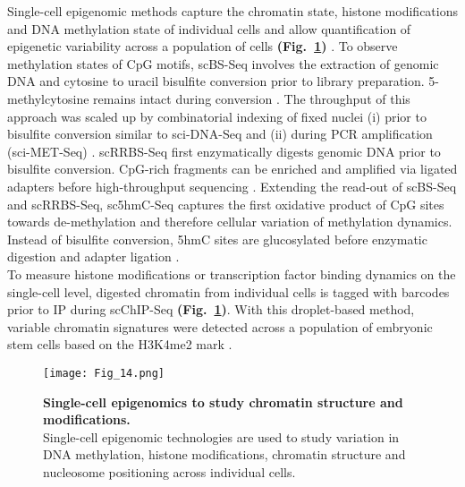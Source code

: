 Single-cell epigenomic methods capture the chromatin state, histone modifications and DNA methylation state of individual cells and allow quantification of epigenetic variability across a population of cells \textbf{(Fig.~\ref{fig0:scEpigenomics})} \citep{Clark2016}. To observe methylation states of CpG motifs, \gls{scBS-Seq} involves the extraction of genomic DNA and cytosine to uracil bisulfite conversion prior to library preparation. 5-methylcytosine remains intact during conversion \citep{Smallwood2014, Farlik2015}. The throughput of this approach was scaled up by combinatorial indexing of fixed nuclei (i) prior to bisulfite conversion similar to sci-DNA-Seq and (ii) during PCR amplification (sci-MET-Seq) \citep{Basque2017}. \Gls{scRRBS-Seq} first enzymatically digests genomic DNA prior to bisulfite conversion. CpG-rich fragments can be enriched and amplified via ligated adapters before high-throughput sequencing \citep{Guo2013}. Extending the read-out of scBS-Seq and scRRBS-Seq, \gls{sc5hmC-Seq} captures the first oxidative product of CpG sites towards de-methylation and therefore cellular variation of methylation dynamics. Instead of bisulfite conversion, 5hmC sites are glucosylated before enzymatic digestion and adapter ligation \citep{Mooijman2016}. \\

To measure histone modifications or transcription factor binding dynamics on the single-cell level, digested chromatin from individual cells is tagged with barcodes prior to \gls{IP} during \gls{scChIP-Seq} \textbf{(Fig.~\ref{fig0:scEpigenomics})}. With this droplet-based method, variable chromatin signatures were detected across a population of embryonic stem cells based on the \gls{H3K4me2} mark \citep{Rotem2015}. 

\begin{figure}[!h]
\centering
\texttt{[image: Fig\_14.png]}
\caption[Single-cell epigenomics to study chromatin structure and modifications]{\textbf{Single-cell epigenomics to study chromatin structure and modifications.}\\
Single-cell epigenomic technologies are used to study variation in DNA methylation, histone modifications, chromatin structure and nucleosome positioning across individual cells.}
\label{fig0:scEpigenomics}
\end{figure}

